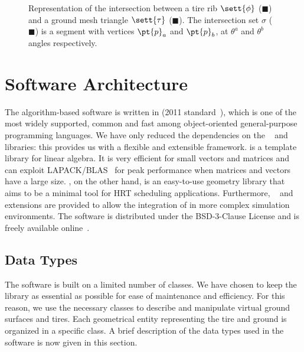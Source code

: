 \begin{figure}[!htb]
  \centering
  \def\svgwidth{0.5\textwidth}
  
  \caption{Representation of the intersection between a tire rib $\sett{\phi}$ (\textcolor[RGB]{255, 231, 187}{$\blacksquare$}) and a ground mesh triangle $\sett{\tau}$ (\textcolor[RGB]{255, 218, 217}{$\blacksquare$}). The intersection set $\sigma$ (\textcolor[RGB]{74, 181, 99}{$\blacksquare$}) is a segment with
  vertices $\pt{p}_a$ and $\pt{p}_b$, at $\theta^a$ and $\theta^b$ angles respectively.}
  \label{app2:fig:intersection}
\end{figure}


\section{Software Architecture}
\label{app2:sec:software_architecture}

The \Enve{} algorithm-based software is written in \cpp{} (2011 standard~\cite{stroustrup2013cpp}), which is one of the most widely supported, common and fast among object-oriented general-purpose programming languages. We have only reduced the dependencies on the \Eigen{}~\cite{eigen2010eigen} and \Acme{}~\cite{stocco2021acme} libraries: this provides us with a flexible and extensible framework. \Eigen{} is a template library for linear algebra. It is very efficient for small vectors and matrices and can exploit \ac{LAPACK}/\ac{BLAS}~\cite{anderson1999lapack} for peak performance when matrices and vectors have a large size. \Acme{}, on the other hand, is an easy-to-use geometry library that aims to be a minimal tool for \ac{HRT} scheduling applications. Furthermore, \Matlab{}~\Mex{} and \Simulink{}~\SFunction{} extensions are provided to allow the integration of \Enve{} in more complex simulation environments. The software is distributed under the BSD-3-Clause License and is freely available online~\cite{enve}.

\subsection{Data Types}
\label{app2:sec:data_types}

The software is built on a limited number of classes. We have chosen to keep the library as essential as possible for ease of maintenance and efficiency. For this reason, we use the necessary classes to describe and manipulate virtual ground surfaces and tires. Each geometrical entity representing the tire and ground is organized in a specific class. A brief description of the data types used in the software is now given in this section.

